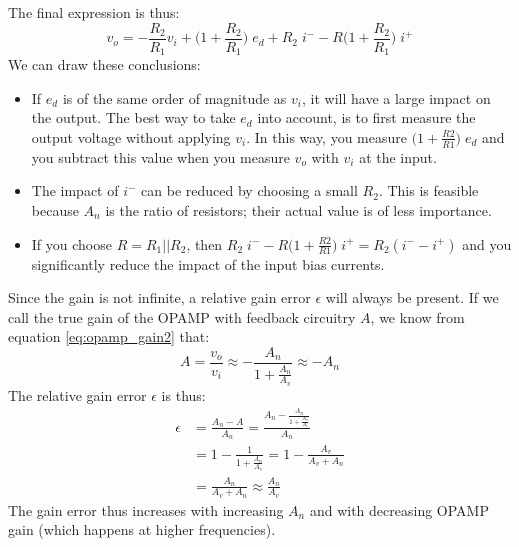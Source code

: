 The final expression is thus:
$$
v_o = -\frac{R_2}{R_1} v_i + \bigg(1 + \frac{R_2}{R_1} \bigg) \; e_d + R_2 \; i^- - R \bigg(1 + \frac{R_2}{R_1} \bigg) \; i^+
$$
We can draw these conclusions:
\begin{itemize}
	\item If $e_d$ is of the same order of magnitude as $v_i$, it will have a large impact on the output. The best way to take $e_d$ into account, is to first measure the output voltage without applying $v_i$. In this way, you measure $\big(1 + \frac{R2}{R1} \big) \; e_d$ and you subtract this value when you measure $v_o$ with $v_i$ at the input.
	\item The impact of $i^-$ can be reduced by choosing a small $R_2$. This is feasible because $A_n$ is the ratio of resistors; their actual value is of less importance.
	\item If you choose $R = R_1 || R_2$, then $R_2 \; i^- - R \bigg(1 + \frac{R2}{R1} \bigg) \; i^+ = R_2 (i^- - i^+)$ and you significantly reduce the impact of the input bias currents.
\end{itemize}
Since the gain is not infinite, a relative gain error $\epsilon$ will always be present. If we call the true gain of the OPAMP with feedback circuitry $A$, we know from equation \ref{eq:opamp_gain2} that:
\begin{equation}
A = \frac{v_o}{v_i}  \approx -\frac{A_n}{1+\frac{A_n}{A_v}} \approx -A_n
	\label{eq:nominal_gain}
\end{equation}
The relative gain error $\epsilon$ is thus:
\begin{equation}
	\begin{split}
	\epsilon &= \frac{A_n - A}{A_n} = \frac{A_n - \frac{A_n}{1+\frac{A_n}{A_v}}}{A_n}\\
			 &= 1 - \frac{1}{1+\frac{A_n}{A_v}} = 1-\frac{A_v}{A_v + A_n} \\
		     &= \frac{A_n}{A_v + A_n} \approx \frac{A_n}{A_v}
	\end{split}
	\label{eq:relative_gain_error}
\end{equation}
The gain error thus increases with increasing $A_n$ and with decreasing OPAMP gain (which happens at higher frequencies).

